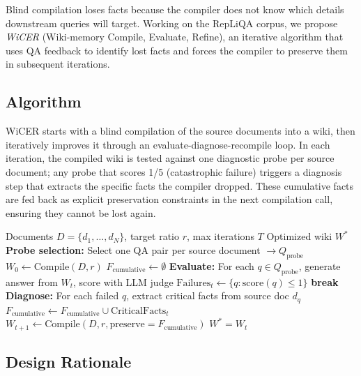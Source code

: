 \documentclass{article}
\begin{document}
Blind compilation loses facts because the compiler does not know which
details downstream queries will target. Working on the RepLiQA corpus,
we propose
\emph{WiCER} (Wiki-memory Compile, Evaluate, Refine), an iterative
algorithm that uses QA feedback to identify lost facts and forces the
compiler to preserve them in subsequent iterations.

\subsection{Algorithm}

WiCER starts with a blind compilation of the source documents into a wiki, then iteratively improves it through an evaluate-diagnose-recompile loop. In each iteration, the compiled wiki is tested against one diagnostic probe per source document; any probe that scores 1/5 (catastrophic failure) triggers a diagnosis step that extracts the specific facts the compiler dropped. These cumulative facts are fed back as explicit preservation constraints in the next compilation call, ensuring they cannot be lost again.

\begin{algorithm}[t]
\caption{WiCER: Wiki-memory Compile, Evaluate, Refine}
\label{alg:wicer}
\begin{algorithmic}[1]
\REQUIRE Documents $D = \{d_1, \ldots, d_N\}$, target ratio $r$, max iterations $T$
\ENSURE Optimized wiki $W^*$
\STATE \textbf{Probe selection:} Select one QA pair per source document $\rightarrow Q_\text{probe}$
\STATE $W_0 \leftarrow \text{Compile}(D, r)$ \hfill {}
\STATE $F_\text{cumulative} \leftarrow \emptyset$
  \STATE \textbf{Evaluate:} For each $q \in Q_\text{probe}$, generate answer from $W_t$, score with LLM judge
  \STATE $\text{Failures}_t \leftarrow \{q : \text{score}(q) \leq 1\}$
    \STATE \textbf{break} \hfill {}
  \ENDIF
  \STATE \textbf{Diagnose:} For each failed $q$, extract critical facts from source doc $d_q$
  \STATE $F_\text{cumulative} \leftarrow F_\text{cumulative} \cup \text{CriticalFacts}_t$
  \STATE $W_{t+1} \leftarrow \text{Compile}(D, r, \text{preserve}=F_\text{cumulative})$
\ENDFOR
\RETURN $W^* = W_t$ \hfill {}
\end{algorithmic}
\end{algorithm}

\subsection{Design Rationale}
\end{document}
